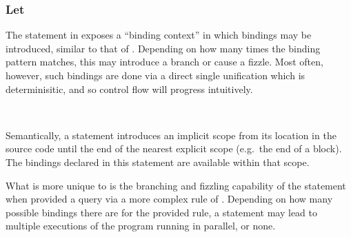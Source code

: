 \subsubsection{Let}

The  statement in \Prose{} exposes a ``binding context'' in which
bindings may be introduced, similar to that of \Law{}. Depending on how many times
the binding pattern matches, this may introduce a branch or cause a fizzle.
Most often, however, such bindings are done via a direct single unification
which is determinisitic, and so control flow will progress intuitively.

\begin{bnf*}
     \\
\end{bnf*}

Semantically, a  statement introduces an implicit scope from its location
in the source code until the end of the nearest explicit scope (e.g.\ the end of a block).
The bindings declared in this statement are available within that scope.

What is more unique to \Trilogy{} is the branching and fizzling capability of the
 statement when provided a query via a more complex rule of \Law{}.
Depending on how many possible bindings there are for the provided rule, a 
statement may lead to multiple executions of the program running in parallel, or none.

\begin{prooftree}
\end{prooftree}
